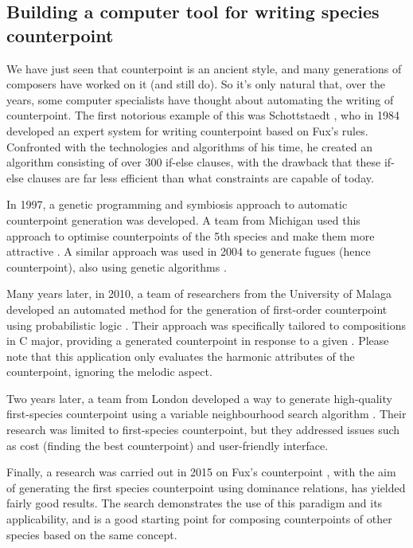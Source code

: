 \subsection{Building a computer tool for writing species counterpoint}
We have just seen that counterpoint is an ancient style, and many generations of composers have worked on it (and still do). So it's only natural that, over the years, some computer specialists have thought about automating the writing of counterpoint. The first notorious example of this was Schottstaedt \cite{bill1984}, who in 1984 developed an expert system for writing counterpoint based on Fux's rules. Confronted with the technologies and algorithms of his time, he created an algorithm consisting of over 300 if-else clauses, with the drawback that these if-else clauses are far less efficient than what constraints are capable of today.

In 1997, a genetic programming and symbiosis approach to automatic counterpoint generation was developed. A team from Michigan used this approach to optimise counterpoints of the 5th species and make them more attractive \cite{polito1997musica}. A similar approach was used in 2004 to generate fugues (hence counterpoint), also using genetic algorithms \cite{garay2004fugue}.  

Many years later, in 2010, a team of researchers from the University of Malaga developed an automated method for the generation of first-order counterpoint using probabilistic logic \cite{Aguilera2010}. Their approach was specifically tailored to compositions in C major, providing a generated counterpoint in response to a given \cf. Please note that this application only evaluates the harmonic attributes of the counterpoint, ignoring the melodic aspect.

Two years later, a team from London developed a way to generate high-quality first-species counterpoint using a variable neighbourhood search algorithm \cite{Herremans2012}. Their research was limited to first-species counterpoint, but they addressed issues such as cost (finding the best counterpoint) and user-friendly interface.

Finally, a research was carried out in 2015 on Fux's counterpoint \cite{komosinski2015automatic}, with the aim of generating the first species counterpoint using dominance relations, has yielded fairly good results. The search demonstrates the use of this paradigm and its applicability, and is a good starting point for composing counterpoints of other species based on the same concept.

